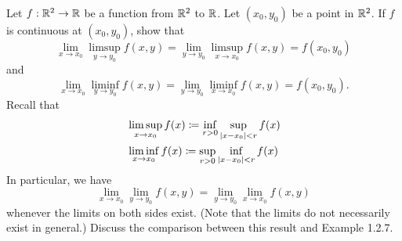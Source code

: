 \begin{ex}\label{ii:ex:2.2.9}
  Let \(f : \mathbb{R}^2 \to \mathbb{R}\) be a function from \(\mathbb{R}^2\) to \(\mathbb{R}\).
  Let \((x_0, y_0)\) be a point in \(\mathbb{R}^2\).
  If \(f\) is continuous at \((x_0, y_0)\), show that
  \[
    \lim_{x \to x_0} \limsup_{y \to y_0} f(x, y) = \lim_{y \to y_0} \limsup_{x \to x_0} f(x, y) = f(x_0, y_0)
  \]
  and
  \[
    \lim_{x \to x_0} \liminf_{y \to y_0} f(x, y) = \lim_{y \to y_0} \liminf_{x \to x_0} f(x, y) = f(x_0, y_0).
  \]
  Recall that
  \begin{align*}
     & \limsup_{x \to x_0} f(x) \coloneqq \inf_{r > 0} \sup_{\left\lvert x - x_0\right\rvert < r} f(x) \\
     & \liminf_{x \to x_0} f(x) \coloneqq \sup_{r > 0} \inf_{\left\lvert x - x_0\right\rvert < r} f(x)
  \end{align*}
  In particular, we have
  \[
    \lim_{x \to x_0} \lim_{y \to y_0} f(x, y) = \lim_{y \to y_0} \lim_{x \to x_0} f(x, y)
  \]
  whenever the limits on both sides exist.
  (Note that the limits do not necessarily exist in general.)
  Discuss the comparison between this result and Example 1.2.7.
\end{ex}

